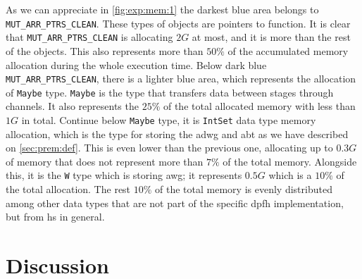As we can appreciate in \autoref{fig:exp:mem:1} the darkest blue area belongs to \texttt{MUT\_ARR\_PTRS\_CLEAN}. These types of objects are pointers to function.
It is clear that \texttt{MUT\_ARR\_PTRS\_CLEAN} is allocating $2G$ at most, and it is more than the rest of the objects. This also represents more than $50\%$ of the accumulated memory allocation during the whole execution time.
Below dark blue \texttt{MUT\_ARR\_PTRS\_CLEAN}, there is a lighter blue area, which represents the allocation of \texttt{Maybe} type. \texttt{Maybe} is the type that transfers data between stages through channels. It also represents the $25\%$ of the total allocated memory with less than $1G$ in total.
Continue below \texttt{Maybe} type, it is \texttt{IntSet} data type memory allocation, which is the type for storing the \acrshort{adwg} and \acrshort{abt} as we have described on \autoref{sec:prem:def}. This is even lower than the previous one, allocating up to $0.3G$ of memory that does not represent more than $7\%$ of the total memory. 
Alongside this, it is the \texttt{W} type which is storing \acrshort{awg}; it represents $0.5G$ which is a $10\%$ of the total allocation.
The rest $10\%$ of the total memory is evenly distributed among other data types that are not part of the specific \acrshort{dpfh} implementation, but from \acrshort{hs} in general.
 
\section{Discussion}\label{sec:exp:discussion}
